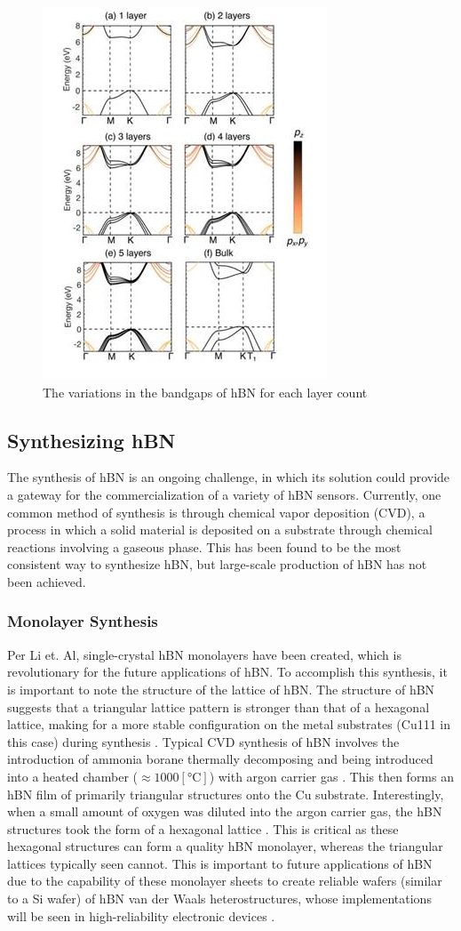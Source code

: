 \documentclass[conference]{IEEEtran}
\begin{document}
\begin{figure}[h]
  \centering
  \includegraphics[width=.45\textwidth]{Figures/hBN-Layers}
  \caption{The variations in the bandgaps of hBN for each layer count \cite{jb1}}
  \label{fig:2}
\end{figure}
 
\subsection{Synthesizing hBN}

The synthesis of hBN is an ongoing challenge, in which its solution could provide a gateway for the commercialization of a variety of hBN sensors. Currently, one common method of synthesis is through chemical vapor deposition (CVD), a process in which a solid material is deposited on a substrate through chemical reactions involving a gaseous phase. This has been found to be the most consistent way to synthesize hBN, but large-scale production of hBN has not been achieved.

\subsubsection{Monolayer Synthesis}

Per Li et. Al, single-crystal hBN monolayers have been created, which is revolutionary for the future applications of hBN. To accomplish this synthesis, it is important to note the structure of the lattice of hBN. The structure of hBN suggests that a triangular lattice pattern is stronger than that of a hexagonal lattice, making for a more stable configuration on the metal substrates (Cu111 in this case) during synthesis \cite{jb2}. Typical CVD synthesis of hBN involves the introduction of ammonia borane thermally decomposing and being introduced into a heated chamber ($\approx1000[\si{\celsius}]$) with argon carrier gas \cite{jb2}. This then forms an hBN film of primarily triangular structures onto the Cu substrate. Interestingly, when a small amount of oxygen was diluted into the argon carrier gas, the hBN structures took the form of a hexagonal lattice \cite{jb3}. This is critical as these hexagonal structures can form a quality hBN monolayer, whereas the triangular lattices typically seen cannot. This is important to future applications of hBN due to the capability of these monolayer sheets to create reliable wafers (similar to a Si wafer) of hBN van der Waals heterostructures, whose implementations will be seen in high-reliability electronic devices \cite{jb1}.
\end{document}
